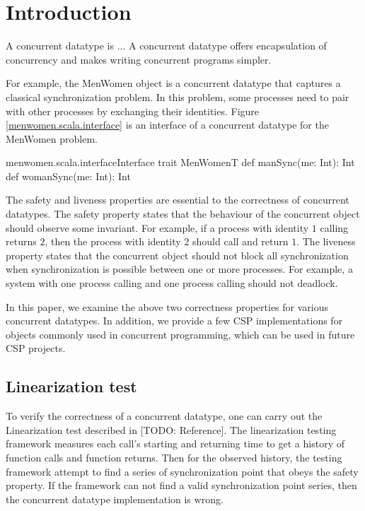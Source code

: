 \documentclass{article}
\begin{document}
\section{Introduction}
A concurrent datatype is ... A concurrent datatype offers encapsulation of concurrency and makes writing concurrent programs simpler. 

For example, the MenWomen object is a concurrent datatype that captures a classical synchronization problem. In this problem, some processes need to pair with other processes by exchanging their identities. Figure \ref{menwomen.scala.interface} is an interface of a concurrent datatype for the MenWomen problem. 

\begin{scalainline}{menwomen.scala.interface}{Interface}
  trait MenWomenT{
    def manSync(me: Int): Int
    def womanSync(me: Int): Int
  }
\end{scalainline}

The safety and liveness properties are essential to the correctness of concurrent datatypes. The safety property states that the behaviour of the concurrent object should observe some invariant. For example, if a process with identity $1$ calling  returns $2$, then the process with identity $2$ should call  and return $1$. The liveness property states that the concurrent object should not block all synchronization when synchronization is possible between one or more processes. For example, a system with one process calling  and one process calling  should not deadlock.

In this paper, we examine the above two correctness properties for various concurrent datatypes. In addition, we provide a few CSP implementations for objects commonly used in concurrent programming, which can be used in future CSP projects.

\subsection{Linearization test}
To verify the correctness of a concurrent datatype, one can carry out the Linearization test described in [TODO: Reference]. The linearization testing framework measures each call's starting and returning time to get a history of function calls and function returns. Then for the observed history, the testing framework attempt to find a series of synchronization point that obeys the safety property. If the framework can not find a valid synchronization point series, then the concurrent datatype implementation is wrong. 
\end{document}

